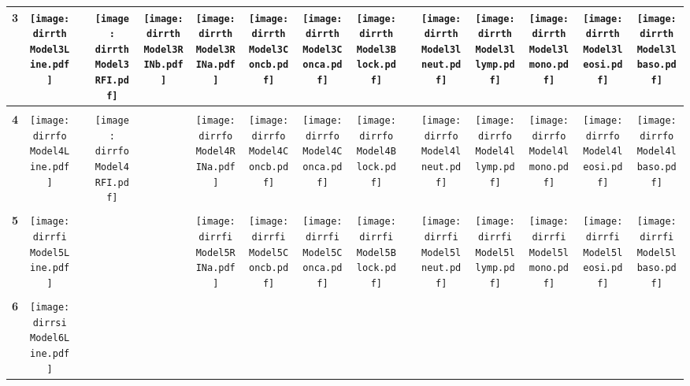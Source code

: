 \documentclass[landscape]{article}
\def \dirrth {U:/R/RA/Data/RFI-newdata/resultsimulation/pvalue05/Model3.Line.RFI.Concb.RINb.Conca.RINa.lneut.llymp.lmono.leosi.lbaso.Block/}
\def \dirrfo {U:/R/RA/Data/RFI-newdata/resultsimulation/pvalue05/Model4.Line.RFI.Concb.Conca.RINa.lneut.llymp.lmono.leosi.lbaso.Block/}
\def \dirrfi {U:/R/RA/Data/RFI-newdata/resultsimulation/pvalue05/Model5.Line.Concb.Conca.RINa.lneut.llymp.lmono.leosi.lbaso.Block/}
\def \dirrsi{U:/R/RA/Data/RFI-newdata/resultsimulation/pvalue05/Model6.Line.Concb.RINa.lneut.llymp.lmono.leosi.lbaso.Block/}
\begin{document}
\begin{table}
\begin{tabular}{ccccccccccccccc}
     \\[3.5pt]
      {\Huge \textbf{3}} 
      &\texttt{[image: \\dirrth Model3Line.pdf]}
      &
      &\texttt{[image: \\dirrth Model3RFI.pdf]}
      &\texttt{[image: \\dirrth Model3RINb.pdf]}
      &\texttt{[image: \\dirrth Model3RINa.pdf]}
      &\texttt{[image: \\dirrth Model3Concb.pdf]}
      &\texttt{[image: \\dirrth Model3Conca.pdf]}
      &\texttt{[image: \\dirrth Model3Block.pdf]}
      &
      &\texttt{[image: \\dirrth Model3lneut.pdf]}
      &\texttt{[image: \\dirrth Model3llymp.pdf]}
      &\texttt{[image: \\dirrth Model3lmono.pdf]}
      &\texttt{[image: \\dirrth Model3leosi.pdf]}
      &\texttt{[image: \\dirrth Model3lbaso.pdf]}
     \\[3.5pt]
     \hline
     \\[3.5pt]
     {\Huge \textbf{4}} 
      &\texttt{[image: \\dirrfo Model4Line.pdf]}
      &
      &\texttt{[image: \\dirrfo Model4RFI.pdf]}
      &
      &\texttt{[image: \\dirrfo Model4RINa.pdf]}
      &\texttt{[image: \\dirrfo Model4Concb.pdf]}
      &\texttt{[image: \\dirrfo Model4Conca.pdf]}
      &\texttt{[image: \\dirrfo Model4Block.pdf]}
      &
      &\texttt{[image: \\dirrfo Model4lneut.pdf]}
      &\texttt{[image: \\dirrfo Model4llymp.pdf]}
      &\texttt{[image: \\dirrfo Model4lmono.pdf]}
      &\texttt{[image: \\dirrfo Model4leosi.pdf]}
      &\texttt{[image: \\dirrfo Model4lbaso.pdf]}
     \\[3.5pt]
     \hline
     \\[3.5pt]
     {\Huge \textbf{5}} 
      &\texttt{[image: \\dirrfi Model5Line.pdf]}
      &
      &
      &
      &\texttt{[image: \\dirrfi Model5RINa.pdf]}
      &\texttt{[image: \\dirrfi Model5Concb.pdf]}
      &\texttt{[image: \\dirrfi Model5Conca.pdf]}
      &\texttt{[image: \\dirrfi Model5Block.pdf]}
      &
      &\texttt{[image: \\dirrfi Model5lneut.pdf]}
      &\texttt{[image: \\dirrfi Model5llymp.pdf]}
      &\texttt{[image: \\dirrfi Model5lmono.pdf]}
      &\texttt{[image: \\dirrfi Model5leosi.pdf]}
      &\texttt{[image: \\dirrfi Model5lbaso.pdf]}
     \\[3.5pt]
     \hline
     \\[3.5pt]
     {\Huge \textbf{6}} 
      &\texttt{[image: \\dirrsi Model6Line.pdf]}

\end{tabular}
\end{table}
\end{document}
